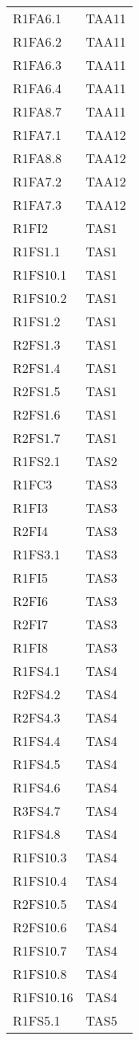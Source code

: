 {\begin{longtable}{C{4cm} C{4cm}}
R1FA6.1 & TAA11  \\
R1FA6.2 & TAA11  \\
R1FA6.3 & TAA11  \\
R1FA6.4 & TAA11  \\
R1FA8.7 & TAA11  \\

R1FA7.1 & TAA12  \\
R1FA8.8 & TAA12  \\
R1FA7.2 & TAA12  \\
R1FA7.3 & TAA12  \\

R1FI2 & TAS1 \\
R1FS1.1 & TAS1 \\
R1FS10.1 & TAS1 \\
R1FS10.2 & TAS1 \\
R1FS1.2 & TAS1 \\
R2FS1.3 & TAS1 \\
R2FS1.4 & TAS1 \\
R2FS1.5 & TAS1 \\
R2FS1.6 & TAS1 \\
R2FS1.7 & TAS1 \\
R1FS2.1 & TAS2 \\
R1FC3 & TAS3 \\
R1FI3 & TAS3 \\
R2FI4 & TAS3 \\
R1FS3.1 & TAS3 \\
R1FI5 & TAS3 \\
R2FI6 & TAS3 \\
R2FI7 & TAS3 \\
R1FI8 & TAS3 \\
R1FS4.1 & TAS4 \\
R2FS4.2 & TAS4 \\
R2FS4.3 & TAS4 \\
R1FS4.4 & TAS4 \\
R1FS4.5 & TAS4 \\
R1FS4.6 & TAS4 \\
R3FS4.7 & TAS4 \\
R1FS4.8 & TAS4 \\
R1FS10.3 & TAS4 \\
R1FS10.4 & TAS4 \\
R2FS10.5 & TAS4 \\
R2FS10.6 & TAS4 \\
R1FS10.7 & TAS4 \\
R1FS10.8 & TAS4 \\
R1FS10.16 & TAS4 \\
R1FS5.1 & TAS5 \\

\end{longtable}}
